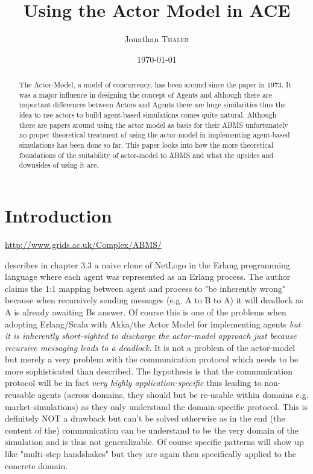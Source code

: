 \documentclass{article}
\title{Using the Actor Model in ACE} %
\author{Jonathan \textsc{Thaler}}
\date{\today}
\begin{document}
\maketitle 

\begin{abstract}
The Actor-Model, a model of concurrency, has been around since the paper \cite{Hewitt_1973} in 1973. It was a major influence in designing the concept of Agents and although there are important differences between Actors and Agents there are huge similarities thus the idea to use actors to build agent-based simulations comes quite natural. Although there are papers around using the actor model as basis for their ABMS unfortunately no proper theoretical treatment of using the actor-model in implementing agent-based simulations has been done so far. This paper looks into how the more theoretical foundations of the suitability of actor-model to ABMS and what the upsides and downsides of using it are.
\end{abstract}

\section{Introduction}
\url{http://www.grids.ac.uk/Complex/ABMS/}

\cite{Bezirgiannis2013} describes in chapter 3.3 a naive clone of NetLogo in the Erlang programming language where each agent was represented as an Erlang process. The author claims the 1:1 mapping between agent and process to "be inherently wrong" because when recursively sending messages (e.g. A to B to A) it will deadlock as A is already awaiting Bs answer. Of course this is one of the problems when adopting Erlang/Scala with Akka/the Actor Model for implementing agents \textit{but it is inherently short-sighted to discharge the actor-model approach just because recursive messaging leads to a deadlock}. It is not a problem of the actor-model but merely a very problem with the communication protocol which needs to be more sophisticated than \cite{Bezirgiannis2013} described. The hypothesis is that the communication protocol will be in fact \textit{very highly application-specific} thus leading to non-reusable agents (across domains, they should but be re-usable within domains e.g. market-simulations) as they only understand the domain-specific protocol. This is definitely NOT a drawback but can't be solved otherwise as in the end (the content of the) communication can be understand to be the very domain of the simulation and is thus not generalizable. Of course specific patterns will show up like "multi-step handshakes" but they are again then specifically applied to the concrete domain.
\end{document}
